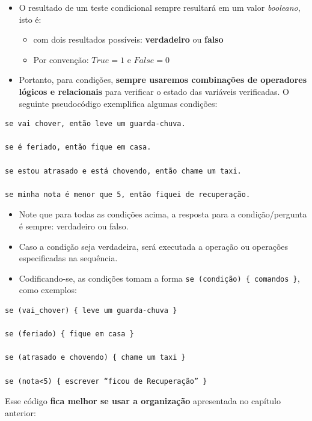 \documentclass[12pt,a4paper]{article}
\providecommand{\tightlist}{%
      \setlength{\itemsep}{0pt}\setlength{\parskip}{0pt}}
\begin{document}
    \begin{itemize}
\tightlist
\item
  O resultado de um teste condicional sempre resultará em um valor
  \emph{booleano}, isto é:

  \begin{itemize}
  \tightlist
  \item
    com dois resultados possíveis: \textbf{verdadeiro} ou \textbf{falso}
  \item
    Por convenção: \(True=1\) e \(False=0\)
  \end{itemize}
\item
  Portanto, para condições, \textbf{sempre usaremos combinações de
  operadores lógicos e relacionais} para verificar o estado das
  variáveis verificadas. O seguinte pseudocódigo exemplifica algumas
  condições:
\end{itemize}

    \begin{verbatim}
se vai chover, então leve um guarda-chuva.

se é feriado, então fique em casa.

se estou atrasado e está chovendo, então chame um taxi.

se minha nota é menor que 5, então fiquei de recuperação.
\end{verbatim}

    \begin{itemize}
\item
  Note que para todas as condições acima, a resposta para a
  condição/pergunta é sempre: verdadeiro ou falso.
\item
  Caso a condição seja verdadeira, será executada a operação ou
  operações especificadas na sequência.
\item
  Codificando-se, as condições tomam a forma
  \texttt{se\ (condição)\ \{\ comandos\ \}}, como exemplos:
\end{itemize}

    \begin{verbatim}
se (vai_chover) { leve um guarda-chuva }

se (feriado) { fique em casa }

se (atrasado e chovendo) { chame um taxi }

se (nota<5) { escrever “ficou de Recuperação” }
\end{verbatim}

    Esse código \textbf{fica melhor se usar a organização} apresentada no
capítulo anterior:
\end{document}
